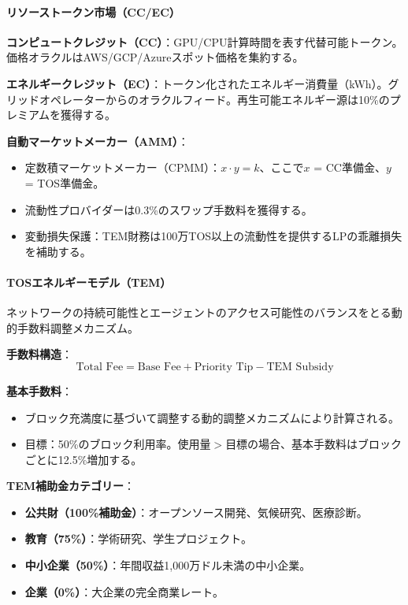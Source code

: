 \documentclass[11pt]{article}
\begin{document}
\paragraph{リソーストークン市場（CC/EC）}
\textbf{コンピュートクレジット（CC）}：GPU/CPU計算時間を表す代替可能トークン。価格オラクルはAWS/GCP/Azureスポット価格を集約する。

\textbf{エネルギークレジット（EC）}：トークン化されたエネルギー消費量（kWh）。グリッドオペレーターからのオラクルフィード。再生可能エネルギー源は10\%のプレミアムを獲得する。

\textbf{自動マーケットメーカー（AMM）}：
\begin{itemize}[noitemsep]
  \item 定数積マーケットメーカー（CPMM）：$x \cdot y = k$、ここで$x$ = CC準備金、$y$ = TOS準備金。
  \item 流動性プロバイダーは0.3\%のスワップ手数料を獲得する。
  \item 変動損失保護：TEM財務は100万TOS以上の流動性を提供するLPの乖離損失を補助する。
\end{itemize}

\paragraph{TOSエネルギーモデル（TEM）}
ネットワークの持続可能性とエージェントのアクセス可能性のバランスをとる動的手数料調整メカニズム。

\textbf{手数料構造}：
\begin{equation}
\text{Total Fee} = \text{Base Fee} + \text{Priority Tip} - \text{TEM Subsidy}
\end{equation}

\textbf{基本手数料}：
\begin{itemize}[noitemsep]
  \item ブロック充満度に基づいて調整する動的調整メカニズムにより計算される。
  \item 目標：50\%のブロック利用率。使用量$>$目標の場合、基本手数料はブロックごとに12.5\%増加する。
\end{itemize}

\textbf{TEM補助金カテゴリー}：
\begin{itemize}[noitemsep]
  \item \textbf{公共財（100\%補助金）}：オープンソース開発、気候研究、医療診断。
  \item \textbf{教育（75\%）}：学術研究、学生プロジェクト。
  \item \textbf{中小企業（50\%）}：年間収益1,000万ドル未満の中小企業。
  \item \textbf{企業（0\%）}：大企業の完全商業レート。
\end{itemize}
\end{document}
